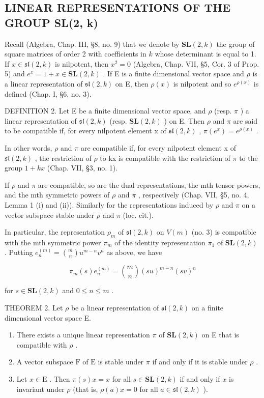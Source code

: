 \subsection{LINEAR REPRESENTATIONS OF THE GROUP SL(2, k)}

Recall (Algebra, Chap. III, §8, no. 9) that we denote by \(\mathbf{SL}(2,k)\) the group of square matrices of order 2 with coefficients in \(k\) whose determinant is equal to 1. If \(x\in \mathfrak{sl}(2,k)\) is nilpotent, then \(x^{2} = 0\) (Algebra, Chap. VII, §5, Cor. 3 of Prop. 5) and \(e^x = 1 + x\in \mathbf{SL}(2,k)\) . If E is a finite dimensional vector space and \(\rho\) is a linear representation of \(\mathfrak{sl}(2,k)\) on E, then \(\rho (x)\) is nilpotent and so \(e^{\rho (x)}\) is defined (Chap. I, §6, no. 3).

DEFINITION 2. Let E be a finite dimensional vector space, and \(\rho\) (resp. \(\pi\) ) a linear representation of \(\mathfrak{sl}(2,k)\) (resp. \(\mathbf{SL}(2,k)\) ) on E. Then \(\rho\) and \(\pi\) are said to be compatible if, for every nilpotent element x of \(\mathfrak{sl}(2,k)\) , \(\pi(e^{x}) = e^{\rho(x)}\) .

In other words, \(\rho\) and \(\pi\) are compatible if, for every nilpotent element x of \(\mathfrak{sl}(2,k)\) , the restriction of \(\rho\) to kx is compatible with the restriction of \(\pi\) to the group \(1 + kx\) (Chap. VII, §3, no. 1).

If \(\rho\) and \(\pi\) are compatible, so are the dual representations, the mth tensor powers, and the mth symmetric powers of \(\rho\) and \(\pi\) , respectively (Chap. VII, §5, no. 4, Lemma 1 (i) and (ii)). Similarly for the representations induced by \(\rho\) and \(\pi\) on a vector subspace stable under \(\rho\) and \(\pi\) (loc. cit.).

In particular, the representation \(\rho_{m}\) of \(\mathfrak{sl}(2,k)\) on \(V(m)\) (no. 3) is compatible with the mth symmetric power \(\pi_{m}\) of the identity representation \(\pi_{1}\) of \(\mathbf{SL}(2,k)\) . Putting \(e_{n}^{(m)} = \binom{m}{n} u^{m-n} v^{n}\) as above, we have

\[
\pi_ {m} (s) e _ {n} ^ {(m)} = \binom {m} {n} (s u) ^ {m - n} (s v) ^ {n}\tag{3}
\]

for \(s \in \mathbf{SL}(2, k)\) and \(0 \leq n \leq m\) .

THEOREM 2. Let \(\rho\) be a linear representation of \(\mathfrak{sl}(2,k)\) on a finite dimensional vector space E.

\begin{enumerate}
\def\labelenumi{(\roman{enumi})}
\item
  There exists a unique linear representation \(\pi\) of \(\mathbf{SL}(2,k)\) on E that is compatible with \(\rho\) .
\item
  A vector subspace \(\mathrm{F}\) of \(\mathrm{E}\) is stable under \(\pi\) if and only if it is stable under \(\rho\) .
\item
  Let \(x \in \mathrm{E}\) . Then \(\pi(s)x = x\) for all \(s \in \mathbf{SL}(2,k)\) if and only if \(x\) is invariant under \(\rho\) (that is, \(\rho(a)x = 0\) for all \(a \in \mathfrak{sl}(2,k)\) ).
\end{enumerate}

